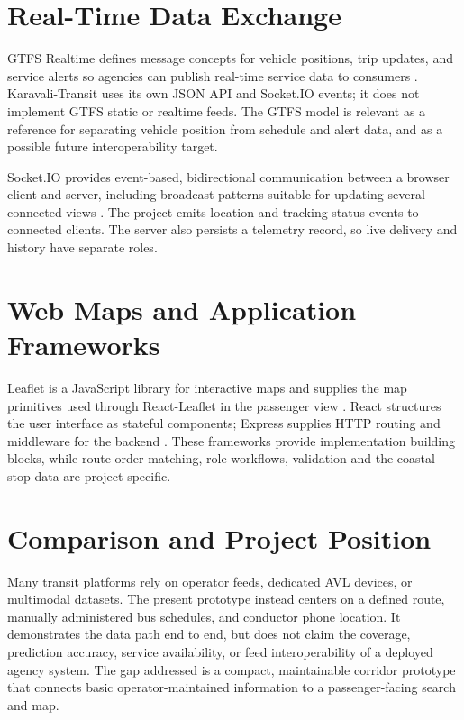\documentclass[12pt,a4paper]{report}
\begin{document}
\section{Real-Time Data Exchange}
GTFS Realtime defines message concepts for vehicle positions, trip updates, and service alerts so agencies can publish real-time service data to consumers \cite{gtfsrt}. Karavali-Transit uses its own JSON API and Socket.IO events; it does not implement GTFS static or realtime feeds. The GTFS model is relevant as a reference for separating vehicle position from schedule and alert data, and as a possible future interoperability target.

Socket.IO provides event-based, bidirectional communication between a browser client and server, including broadcast patterns suitable for updating several connected views \cite{socketio}. The project emits location and tracking status events to connected clients. The server also persists a telemetry record, so live delivery and history have separate roles.

\section{Web Maps and Application Frameworks}
Leaflet is a JavaScript library for interactive maps and supplies the map primitives used through React-Leaflet in the passenger view \cite{leaflet}. React structures the user interface as stateful components; Express supplies HTTP routing and middleware for the backend \cite{react,express}. These frameworks provide implementation building blocks, while route-order matching, role workflows, validation and the coastal stop data are project-specific.

\section{Comparison and Project Position}
Many transit platforms rely on operator feeds, dedicated AVL devices, or multimodal datasets. The present prototype instead centers on a defined route, manually administered bus schedules, and conductor phone location. It demonstrates the data path end to end, but does not claim the coverage, prediction accuracy, service availability, or feed interoperability of a deployed agency system. The gap addressed is a compact, maintainable corridor prototype that connects basic operator-maintained information to a passenger-facing search and map.

\end{document}
